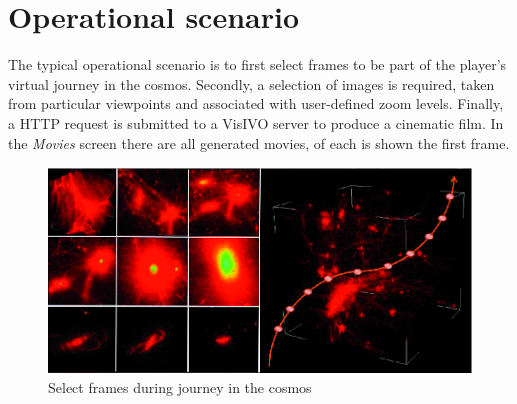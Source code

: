 \documentclass[11pt,twoside]{article}
\begin{document}
\section{Operational scenario}
The typical operational scenario is to first select frames to be part of the player's virtual journey in the cosmos. Secondly, a selection of images is required, taken from particular viewpoints and associated with user-defined zoom levels. Finally, a HTTP request is submitted to a VisIVO server to produce a cinematic film.
In the \emph{Movies} screen there are all generated movies, of each  is shown the first frame.
\begin{figure}[h]
\centering
\includegraphics[scale=0.9]{P024_f2}
\caption{Select frames during journey in the cosmos}
\end{figure}


\end{document}
